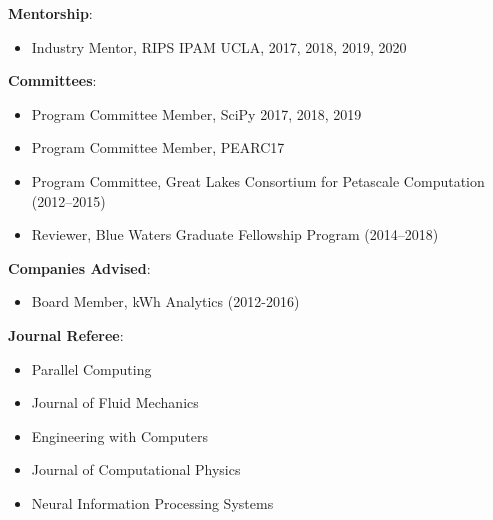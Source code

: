 
\textbf{Mentorship}:
\begin{itemize}
\itemsep 0pt
 \item Industry Mentor, RIPS IPAM UCLA, 2017, 2018, 2019, 2020
\end{itemize}

\blankline


\textbf{Committees}:
\begin{itemize}
\itemsep 0pt
 \item Program Committee Member, SciPy 2017, 2018, 2019
 \item Program Committee Member, PEARC17
 \item Program Committee, Great Lakes Consortium for Petascale Computation (2012--2015)
 \item Reviewer, Blue Waters Graduate Fellowship Program (2014--2018)
\end{itemize}
\blankline


\textbf{Companies Advised}:
\begin{itemize}
\itemsep 0pt
 \item Board Member, kWh Analytics (2012-2016)
\end{itemize}

\blankline

\textbf{Journal Referee}:
\begin{itemize}
\itemsep 0pt
 \item Parallel Computing
 \item Journal of Fluid Mechanics
 \item Engineering with Computers
 \item Journal of Computational Physics
 \item Neural Information Processing Systems
\end{itemize}
